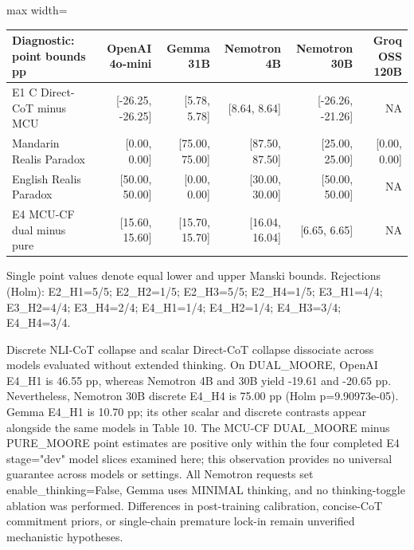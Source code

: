 \documentclass[11pt,a4paper]{article}
\begin{document}
\begin{center}\begingroup\small\setlength{\tabcolsep}{4.5pt}\renewcommand{\arraystretch}{1.12}\begin{adjustbox}{max width=\textwidth}\begin{tabular}{lrrrrr}\toprule
\textbf{Diagnostic: point bounds pp} & \textbf{OpenAI 4o-mini} & \textbf{Gemma 31B} & \textbf{Nemotron 4B} & \textbf{Nemotron 30B} & \textbf{Groq OSS 120B} \\ \midrule
E1 C Direct-CoT minus MCU & [-26.25, -26.25] & [5.78, 5.78] & [8.64, 8.64] & [-26.26, -21.26] & NA \\
Mandarin Realis Paradox & [0.00, 0.00] & [75.00, 75.00] & [87.50, 87.50] & [25.00, 25.00] & [0.00, 0.00] \\
English Realis Paradox & [50.00, 50.00] & [0.00, 0.00] & [30.00, 30.00] & [50.00, 50.00] & NA \\
E4 MCU-CF dual minus pure & [15.60, 15.60] & [15.70, 15.70] & [16.04, 16.04] & [6.65, 6.65] & NA \\
\bottomrule\end{tabular}\end{adjustbox}\endgroup\end{center}

Single point values denote equal lower and upper Manski bounds. Rejections (Holm): E2\_\allowbreak{}H1=5/5; E2\_\allowbreak{}H2=1/5; E2\_\allowbreak{}H3=5/5; E2\_\allowbreak{}H4=1/5; E3\_\allowbreak{}H1=4/4; E3\_\allowbreak{}H2=4/4; E3\_\allowbreak{}H4=2/4; E4\_\allowbreak{}H1=1/4; E4\_\allowbreak{}H2=1/4; E4\_\allowbreak{}H3=3/4; E4\_\allowbreak{}H4=3/4.


Discrete NLI-CoT collapse and scalar Direct-CoT collapse dissociate across models evaluated without extended thinking. On DUAL\_\allowbreak{}MOORE, OpenAI E4\_\allowbreak{}H1 is 46.55 pp, whereas Nemotron 4B and 30B yield -19.61 and -20.65 pp. Nevertheless, Nemotron 30B discrete E4\_\allowbreak{}H4 is 75.00 pp (Holm p=9.90973e-05). Gemma E4\_\allowbreak{}H1 is 10.70 pp; its other scalar and discrete contrasts appear alongside the same models in Table 10. The MCU-CF DUAL\_\allowbreak{}MOORE minus PURE\_\allowbreak{}MOORE point estimates are positive only within the four completed E4 stage="dev" model slices examined here; this observation provides no universal guarantee across models or settings. All Nemotron requests set enable\_\allowbreak{}thinking=False, Gemma uses MINIMAL thinking, and no thinking-toggle ablation was performed. Differences in post-training calibration, concise-CoT commitment priors, or single-chain premature lock-in remain unverified mechanistic hypotheses.
\end{document}
